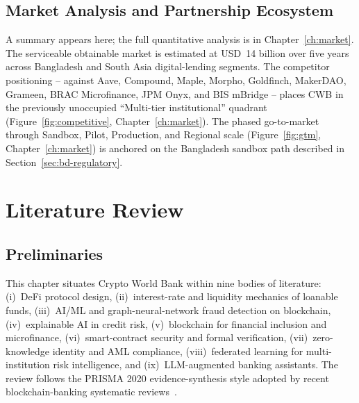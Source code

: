 \documentclass[12pt,a4paper]{report}
\begin{document}
\section{Market Analysis and Partnership Ecosystem}
\label{sec:market-summary}
A summary appears here; the full quantitative analysis is in Chapter~\ref{ch:market}. The serviceable obtainable market is estimated at USD~14 billion over five years across Bangladesh and South Asia digital-lending segments. The competitor positioning -- against Aave, Compound, Maple, Morpho, Goldfinch, MakerDAO, Grameen, BRAC Microfinance, JPM Onyx, and BIS mBridge -- places CWB in the previously unoccupied ``Multi-tier institutional'' quadrant (Figure~\ref{fig:competitive}, Chapter~\ref{ch:market}). The phased go-to-market through Sandbox, Pilot, Production, and Regional scale (Figure~\ref{fig:gtm}, Chapter~\ref{ch:market}) is anchored on the Bangladesh sandbox path described in Section~\ref{sec:bd-regulatory}.

\chapter{Literature Review}
\label{ch:lit}

\section{Preliminaries}
\label{sec:lit-pre}

This chapter situates Crypto World Bank within nine bodies of literature: (i)~DeFi protocol design, (ii)~interest-rate and liquidity mechanics of loanable funds, (iii)~AI/ML and graph-neural-network fraud detection on blockchain, (iv)~explainable AI in credit risk, (v)~blockchain for financial inclusion and microfinance, (vi)~smart-contract security and formal verification, (vii)~zero-knowledge identity and AML compliance, (viii)~federated learning for multi-institution risk intelligence, and (ix)~LLM-augmented banking assistants. The review follows the PRISMA 2020 evidence-synthesis style adopted by recent blockchain-banking systematic reviews~\cite{prismaBanking2025,flBlockchainPrisma2024}.
\end{document}
